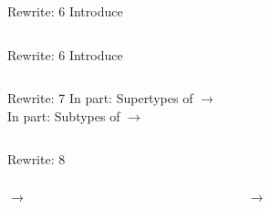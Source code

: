 \begin{frame}{Rewrite: 6}
  Introduce \colorbox{pink!30}{}

  \begin{columns}
    \begin{column}{0.5\textwidth}
      \usebox\typecaseFbox
    \end{column}
    \begin{column}{0.5\textwidth}  %
      \usebox\typecaseGabox
    \end{column}    
  \end{columns}
\end{frame}

\begin{frame}{Rewrite: 6}
  Introduce \colorbox{pink!30}{}

  \begin{columns}
    \begin{column}{0.5\textwidth}
      \usebox\typecaseFbox
    \end{column}
    \begin{column}{0.5\textwidth}  %
      \usebox\typecaseGbox
    \end{column}    
  \end{columns}
\end{frame}

\begin{frame}{Rewrite: 7}
  In  part: \colorbox{pink!30}{Supertypes of  $\to$ }\\
  In  part: \colorbox{pink!30}{Subtypes of  $\to$ }

  \begin{columns}
    \begin{column}{0.5\textwidth}
      \usebox\typecaseGbox
    \end{column}
    \begin{column}{0.5\textwidth}  %
      \usebox\typecaseHhbox
    \end{column}    
  \end{columns}
\end{frame}


\begin{frame}{Rewrite: 8}

  \begin{columns}
    \begin{column}{0.5\textwidth}
      \colorbox{pink!30}{ $\to$ }
      \usebox\typecaseHbox
    \end{column}
    \begin{column}{0.5\textwidth}  %
      \colorbox{pink!30}{ $\to$ }
      \usebox\typecaseIhbox
    \end{column}    
  \end{columns}
\end{frame}

